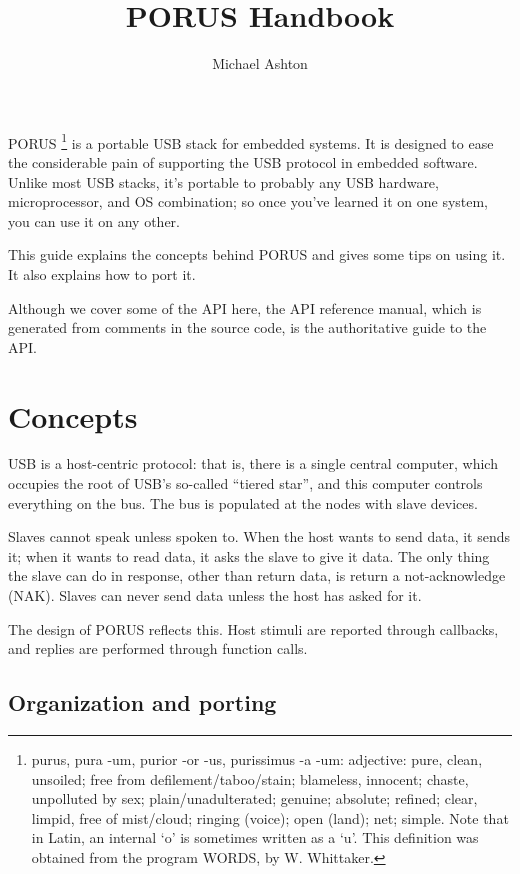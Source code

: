 \documentclass{book}
\newcommand{\porus}{PORUS }
\begin{document}
\title{PORUS Handbook}
\author{Michael Ashton}
\maketitle

\porus\footnote{purus, pura -um, purior -or -us, purissimus -a -um:  adjective: pure, clean, unsoiled; free from defilement/taboo/stain; blameless, innocent; chaste, unpolluted by sex; plain/unadulterated; genuine; absolute; refined; clear, limpid, free of mist/cloud; ringing (voice); open (land); net; simple.  Note that in Latin, an internal `o' is sometimes written as a `u'.  This definition was obtained from the program WORDS, by W. Whittaker.} is a portable USB stack for embedded systems.  It is designed to ease the considerable pain of supporting the USB protocol in embedded software.  Unlike most USB stacks, it's portable to probably any USB hardware, microprocessor, and OS combination; so once you've learned it on one system, you can use it on any other.

This guide explains the concepts behind \porus and gives some tips on using it.  It also explains how to port it.

Although we cover some of the API here, the API reference manual, which is generated from comments in the source code, is the authoritative guide to the API.

\section{Concepts}

USB is a host-centric protocol: that is, there is a single central computer, which occupies the root of USB's so-called ``tiered star'', and this computer controls everything on the bus.  The bus is populated at the nodes with slave devices.

Slaves cannot speak unless spoken to.  When the host wants to send data, it sends it; when it wants to read data, it asks the slave to give it data.  The only thing the slave can do in response, other than return data, is return a not-acknowledge (NAK).  Slaves can never send data unless the host has asked for it.

The design of \porus reflects this.  Host stimuli are reported through callbacks, and replies are performed through function calls.

\subsection{Organization and porting}
\end{document}
